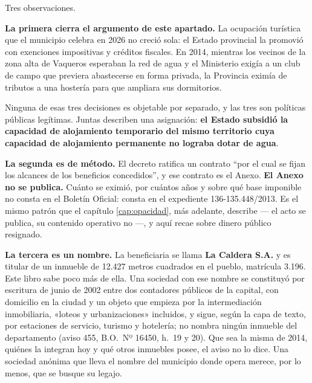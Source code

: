 \begin{cautela}
Tres observaciones.

\textbf{La primera cierra el argumento de este apartado.} La ocupación turística que el municipio celebra en 2026 no creció sola: el Estado provincial la promovió con exenciones impositivas y créditos fiscales. En 2014, mientras los vecinos de la zona alta de Vaqueros esperaban la red de agua y el Ministerio exigía a un club de campo que previera abastecerse en forma privada, la Provincia eximía de tributos a una hostería para que ampliara sus dormitorios.

Ninguna de esas tres decisiones es objetable por separado, y las tres son políticas públicas legítimas. Juntas describen una asignación: \textbf{el Estado subsidió la capacidad de alojamiento temporario del mismo territorio cuya capacidad de alojamiento permanente no lograba dotar de agua}.

\textbf{La segunda es de método.} El decreto ratifica un contrato ``por el cual se fijan los alcances de los beneficios concedidos'', y ese contrato es el Anexo. \textbf{El Anexo no se publica.} Cuánto se eximió, por cuántos años y sobre qué base imponible no consta en el Boletín Oficial: consta en el expediente 136-135.448/2013. Es el mismo patrón que el capítulo \ref{cap:opacidad}, más adelante, describe --- el acto se publica, su contenido operativo no ---, y aquí recae sobre dinero público resignado.

\textbf{La tercera es un nombre.} La beneficiaria se llama \textbf{La Caldera S.A.} y es titular de un inmueble de 12.427 metros cuadrados en el pueblo, matrícula 3.196. Este libro sabe poco más de ella. Una sociedad con ese nombre se constituyó por escritura de junio de 2002 entre dos contadores públicos de la capital, con domicilio en la ciudad y un objeto que empieza por la intermediación inmobiliaria, «loteos y urbanizaciones» incluidos, y sigue, según la capa de texto, por estaciones de servicio, turismo y hotelería; no nombra ningún inmueble del departamento (aviso 455, B.O.\ Nº 16450, h.\ 19 y 20). Que sea la misma de 2014, quiénes la integran hoy y qué otros inmuebles posee, el aviso no lo dice. Una sociedad anónima que lleva el nombre del municipio donde opera merece, por lo menos, que se busque su legajo.
\end{cautela}

